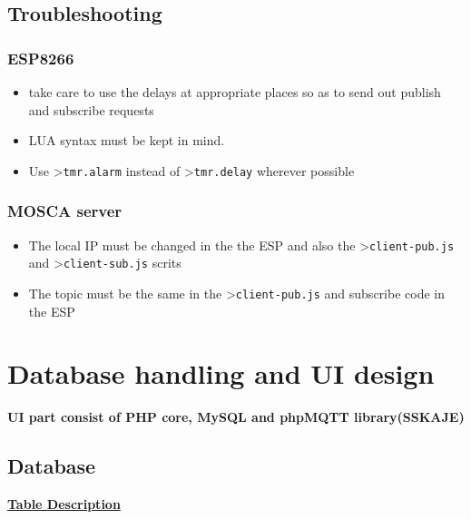 \documentclass[16pt]{article}
\begin{document}
\subsection{Troubleshooting}


\subsubsection{ESP8266}

\begin{itemize}

\item
  take care to use the delays at appropriate places so as to send out
  publish and subscribe requests
\item
  LUA syntax must be kept in mind.
\item
  Use \textgreater{}\texttt{tmr.alarm} instead of
  \textgreater{}\texttt{tmr.delay} wherever possible
\end{itemize}

\vspace{0.6cm}

\subsubsection{MOSCA server}

\begin{itemize}

\item
  The local IP must be changed in the the ESP and also the
  \textgreater{}\texttt{client-pub.js} and
  \textgreater{}\texttt{client-sub.js} scrits
\item
  The topic must be the same in the \textgreater{}\texttt{client-pub.js}
  and subscribe code in the ESP
\end{itemize}

\vspace{0.5cm}



\vspace{12cm}

\section{Database handling and UI design}
{{\textbf{UI part consist of PHP core, MySQL and phpMQTT library(SSKAJE) }}}
\subsection{Database}
\vspace{0.3cm}
{\Large{\underline{\textbf{Table Description}}}}
\vspace{0.2cm}
\end{document}

